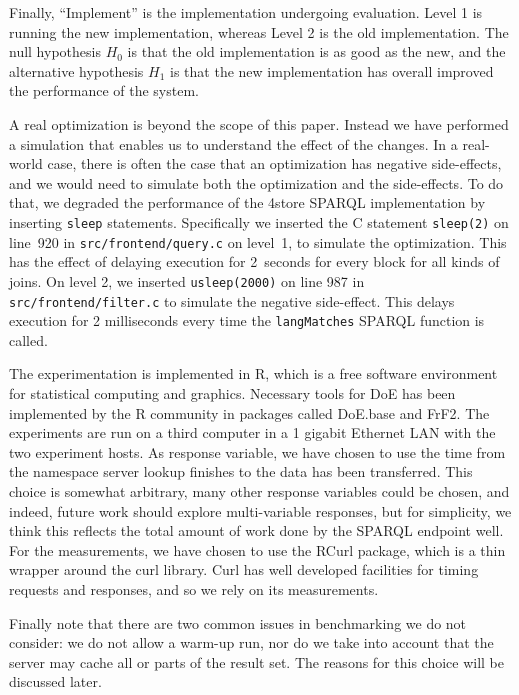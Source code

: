\documentclass{llncs}
\begin{document}
Finally, ``Implement'' is the implementation undergoing
evaluation. Level 1 is running the new implementation, whereas Level 2
is the old implementation. The null hypothesis $H_0$ is that the old
implementation is as good as the new, and the alternative hypothesis
$H_1$ is that the new implementation has overall improved the
performance of the system.

A real optimization is beyond the scope of this paper. Instead we have
performed a simulation that enables us to understand the effect of the
changes.  In a real-world case, there is often the case that an
optimization has negative side-effects, and we would need to simulate
both the optimization and the side-effects. To do that, we degraded
the performance of the 4store SPARQL implementation by inserting
\texttt{sleep} statements. Specifically we inserted the C statement
\texttt{sleep(2)} on line~920 in \texttt{src/frontend/query.c} on
level~1, to simulate the optimization. This has the effect of delaying
execution for 2~seconds for every block for all kinds of joins. On
level 2, we inserted \texttt{usleep(2000)} on line 987 in
\texttt{src/frontend/filter.c} to simulate the negative
side-effect. This delays execution for 2 milliseconds every time the
\texttt{langMatches} SPARQL function is called.

The experimentation is implemented in R\cite{rmanual}, which is a free
software environment for statistical computing and graphics. Necessary
tools for DoE has been implemented by the R community in packages
called DoE.base\cite{doebase} and FrF2\cite{frf2}. The experiments are
run on a third computer in a 1 gigabit Ethernet LAN with the two
experiment hosts.  As response variable, we have chosen to use the
time from the namespace server lookup finishes to the data has been
transferred. This choice is somewhat arbitrary, many other response
variables could be chosen, and indeed, future work should explore
multi-variable responses, but for simplicity, we think this reflects
the total amount of work done by the SPARQL endpoint well. For the
measurements, we have chosen to use the RCurl package\cite{lang2007r},
which is a thin wrapper around the curl library. Curl has well
developed facilities for timing requests and responses, and so we rely
on its measurements.

Finally note that there are two common issues in benchmarking we do
not consider: we do not allow a warm-up run, nor do we take into
account that the server may cache all or parts of the result set. The
reasons for this choice will be discussed later.
\end{document}
